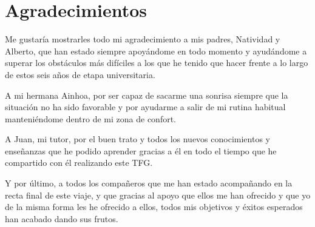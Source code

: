 \cleardoublepage

\chapter*{Agradecimientos}

Me gustaría mostrarles todo mi agradecimiento a mis padres, Natividad y Alberto, que han estado siempre apoyándome en todo momento y ayudándome a superar los obstáculos más difíciles a los que he tenido que hacer frente a lo largo de estos seis años de etapa universitaria.

\vspace{0.25cm}

A mi hermana Ainhoa, por ser capaz de sacarme una sonrisa siempre que la situación no ha sido favorable y por ayudarme a salir de mi rutina habitual manteniéndome dentro de mi zona de confort.

\vspace{0.25cm}

A Juan, mi tutor, por el buen trato y todos los nuevos conocimientos y enseñanzas que he podido aprender gracias a él en todo el tiempo que he compartido con él realizando este TFG.

\vspace{0.25cm}

Y por último, a todos los compañeros que me han estado acompañando en la recta final de este viaje, y que gracias al apoyo que ellos me han ofrecido y que yo de la misma forma les he ofrecido a ellos, todos mis objetivos y éxitos esperados han acabado dando sus frutos.

\thispagestyle{empty}
